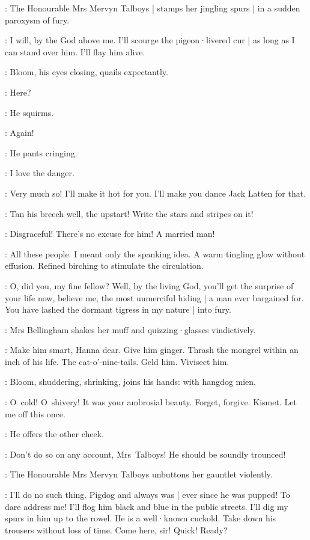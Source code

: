 :
The Honourable Mrs Mervyn Talboys |
stamps her jingling spurs |
in a sudden paroxysm of fury.

\Talboys:
I will,
by the God above me.
I'll scourge the pigeon·livered cur |
as long as I can stand over him.
I'll flay him alive.

:
Bloom,
his eyes closing,
quails expectantly.

\Bloom:
Here?

:
He squirms.

\Bloom:
Again!

:
He pants cringing.

\Bloom:
I love the danger.

\Talboys:
Very much so!
I'll make it hot for you.
I'll make you dance Jack Latten for that.

\Bellingham:
Tan his breech well,
the upstart!
Write the stars and stripes on it!

\Yelverton:
Disgraceful!
There's no excuse for him!
A married man!

\Bloom:
All these people.
I meant only the spanking idea.
A warm tingling glow without effusion.
Refined birching to stimulate the circulation.

\Talboys:
O,
did you,
my fine fellow?
Well,
by the living God,
you'll get the surprise of your life now,
believe me,
the most unmerciful hiding |
a man ever bargained for.
You have lashed the dormant tigress in my nature |
into fury.

:
Mrs Bellingham shakes her muff and quizzing·glasses vindictively.

\Bellingham:
Make him smart,
Hanna dear.
Give him ginger.
Thrash the mongrel within an inch of his life.
The cat-o'-nine-tails.
Geld him.
Vivisect him.

:
Bloom,
shuddering,
shrinking,
joins his hands:
with hangdog mien.

\Bloom:
O~cold!
O~shivery!
It was your ambrosial beauty.
Forget,
forgive.
Kismet.
Let me off this once.

:
He offers the other cheek.

\Yelverton:
Don't do so on any account,
Mrs~Talboys!
He should be soundly trounced!

:
The Honourable Mrs Mervyn Talboys unbuttons her gauntlet violently.

\Talboys:
I'll do no such thing.
Pigdog and always was |
ever since he was pupped!
To dare address me!
I'll flog him black and blue in the public streets.
I'll dig my spurs in him up to the rowel.
He is a well·known cuckold.
Take down his trousers without loss of time.
Come here,
sir!
Quick!
Ready?

